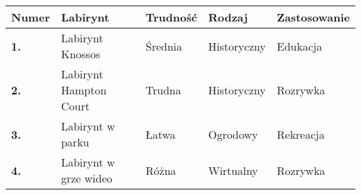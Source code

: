 \begin{table}[hbt!]
\begin{tabular}{|l|l|l|l|l|}
\hline
\textbf{Numer} & \textbf{Labirynt}      & \textbf{Trudność} & \textbf{Rodzaj} & \textbf{Zastosowanie} \\ \hline
\textbf{1.}    & Labirynt Knossos       & Średnia           & Historyczny     & Edukacja              \\ \hline
\textbf{2.}    & Labirynt Hampton Court & Trudna            & Historyczny     & Rozrywka              \\ \hline
\textbf{3.}    & Labirynt w parku       & Łatwa             & Ogrodowy        & Rekreacja             \\ \hline
\textbf{4.}    & Labirynt w grze wideo  & Różna             & Wirtualny       & Rozrywka              \\ \hline
\end{tabular}
\end{table}